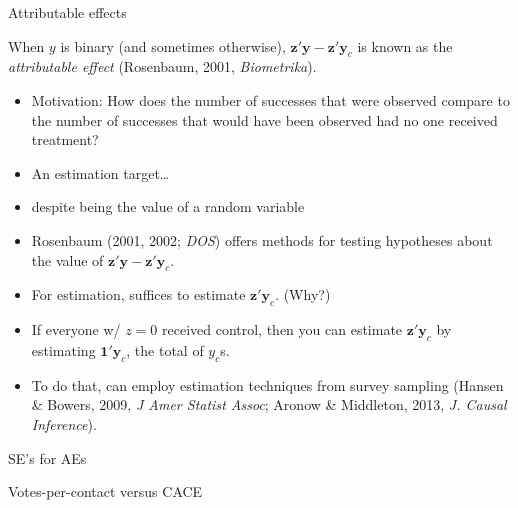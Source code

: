 \begin{frame}{Attributable effects}
  
When $y$ is binary (and sometimes otherwise), $\mathbf{z}'\mathbf{y} - \mathbf{z}'\mathbf{y}_{c}$ is known as the \textit{attributable effect} (Rosenbaum, 2001, \textit{Biometrika}).
\begin{itemize}
\item Motivation: How does the number of successes that were observed
  compare to the number of successes that would have been observed had
  no one received treatment?
\item An estimation target\ldots
\item despite being the value of a random variable
\item Rosenbaum (2001, 2002; \textit{DOS}) offers methods for testing hypotheses about the value of $\mathbf{z}'\mathbf{y} - \mathbf{z}'\mathbf{y}_{c}$.
\item<2-> For estimation, suffices to estimate $\mathbf{z}'\mathbf{y}_{c}$. (Why?)
\item<2-> If everyone w/ $z=0$ received control, then you can estimate  $\mathbf{z}'\mathbf{y}_{c}$ by estimating  $\mathbf{1}'\mathbf{y}_{c}$, the total of $y_{c}$s.
\item<2-> To do that, can employ estimation techniques from survey sampling (Hansen \& Bowers, 2009, \textit{J Amer Statist Assoc}; Aronow \& Middleton, 2013, \textit{J. Causal Inference}).
\end{itemize}


\end{frame}

\begin{frame}{SE's for AEs}
  
\end{frame}

\begin{frame}{Votes-per-contact versus CACE}
  
\end{frame}



